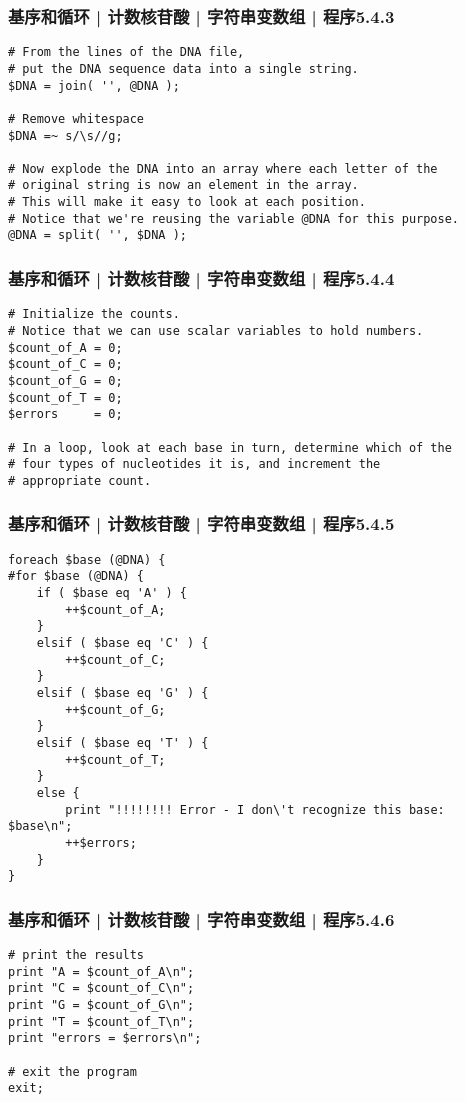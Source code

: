 \begin{frame}[fragile]
  \frametitle{基序和循环 | 计数核苷酸 | 字符串变数组 | 程序5.4.3}
\begin{lstlisting}[firstnumber=26,basicstyle=\small\tt]
# From the lines of the DNA file,
# put the DNA sequence data into a single string.
$DNA = join( '', @DNA );

# Remove whitespace
$DNA =~ s/\s//g;

# Now explode the DNA into an array where each letter of the
# original string is now an element in the array.
# This will make it easy to look at each position.
# Notice that we're reusing the variable @DNA for this purpose.
@DNA = split( '', $DNA );
\end{lstlisting}
\end{frame}

\begin{frame}[fragile]
  \frametitle{基序和循环 | 计数核苷酸 | 字符串变数组 | 程序5.4.4}
\begin{lstlisting}[firstnumber=39]
# Initialize the counts.
# Notice that we can use scalar variables to hold numbers.
$count_of_A = 0;
$count_of_C = 0;
$count_of_G = 0;
$count_of_T = 0;
$errors     = 0;

# In a loop, look at each base in turn, determine which of the
# four types of nucleotides it is, and increment the
# appropriate count.
\end{lstlisting}
\end{frame}

\begin{frame}[fragile]
  \frametitle{基序和循环 | 计数核苷酸 | 字符串变数组 | 程序5.4.5}
\begin{lstlisting}[firstnumber=50,basicstyle=\footnotesize\tt,numberstyle=\scriptsize]
foreach $base (@DNA) {
#for $base (@DNA) {
    if ( $base eq 'A' ) {
        ++$count_of_A;
    }
    elsif ( $base eq 'C' ) {
        ++$count_of_C;
    }
    elsif ( $base eq 'G' ) {
        ++$count_of_G;
    }
    elsif ( $base eq 'T' ) {
        ++$count_of_T;
    }
    else {
        print "!!!!!!!! Error - I don\'t recognize this base: $base\n";
        ++$errors;
    }
}
\end{lstlisting}
\end{frame}

\begin{frame}[fragile]
  \frametitle{基序和循环 | 计数核苷酸 | 字符串变数组 | 程序5.4.6}
\begin{lstlisting}[firstnumber=70]
# print the results
print "A = $count_of_A\n";
print "C = $count_of_C\n";
print "G = $count_of_G\n";
print "T = $count_of_T\n";
print "errors = $errors\n";

# exit the program
exit;
\end{lstlisting}
\end{frame}


